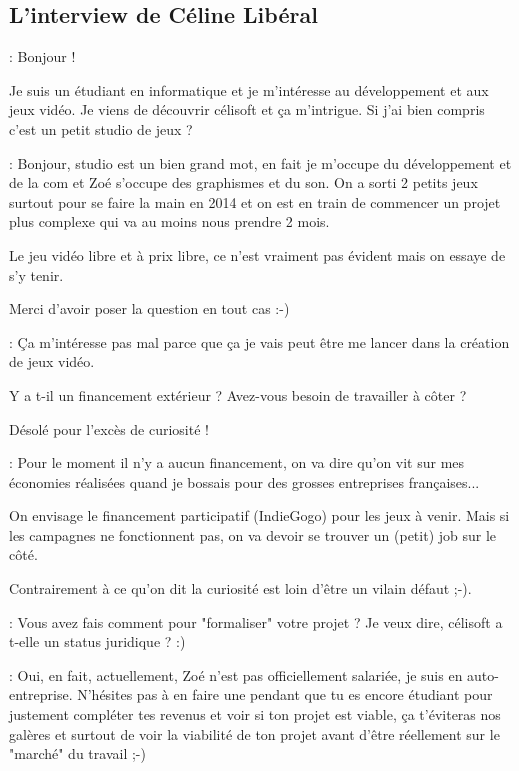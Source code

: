 \documentclass[a4paper,12pt, draft]{report}
\begin{document}
\subsection{L'interview de Céline Libéral}
\begin{description}

\item [Question]: Bonjour !
\item Je suis un étudiant en informatique et je m'intéresse au développement et aux jeux vidéo. Je viens de découvrir célisoft et ça m'intrigue. Si j'ai bien compris c'est un petit studio de jeux ?
\item 
\item [Réponse]: Bonjour, studio est un bien grand mot, en fait je m'occupe du développement et de la com et Zoé s'occupe des graphismes et du son. On a sorti 2 petits jeux surtout pour se faire la main en 2014 et on est en train de commencer un projet plus complexe qui va au moins nous prendre 2 mois.
\item Le jeu vidéo libre et à prix libre, ce n'est vraiment pas évident mais on essaye de s'y tenir.
\item Merci d'avoir poser la question en tout cas :-)
\item 
\item 
\item [Question]: Ça m'intéresse pas mal parce que ça je vais peut être me lancer dans la création de jeux vidéo.
\item Y a t-il un financement extérieur ? Avez-vous besoin de travailler à côter ?
\item Désolé pour l'excès de curiosité !
\item 
\item [Réponse]: Pour le moment il n'y a aucun financement, on va dire qu'on vit sur mes économies réalisées quand je bossais pour des grosses entreprises françaises...
\item On envisage le financement participatif (IndieGogo) pour les jeux à venir. Mais si les campagnes ne fonctionnent pas, on va devoir se trouver un (petit) job sur le côté.
\item 
\item Contrairement à ce qu'on dit la curiosité est loin d'être un vilain défaut ;-).
\item 
\item [Question]: Vous avez fais comment pour "formaliser" votre projet ? Je veux dire, célisoft a t-elle un status juridique ? :)
\item 
\item [Réponse]: Oui, en fait, actuellement, Zoé n'est pas officiellement salariée, je suis en auto-entreprise. N’hésites pas à en faire une pendant que tu es encore étudiant pour justement compléter tes revenus et voir si ton projet est viable, ça t'éviteras nos galères et surtout de voir la viabilité de ton projet avant d'être réellement sur le "marché" du travail ;-)

\end{description}
\end{document}
